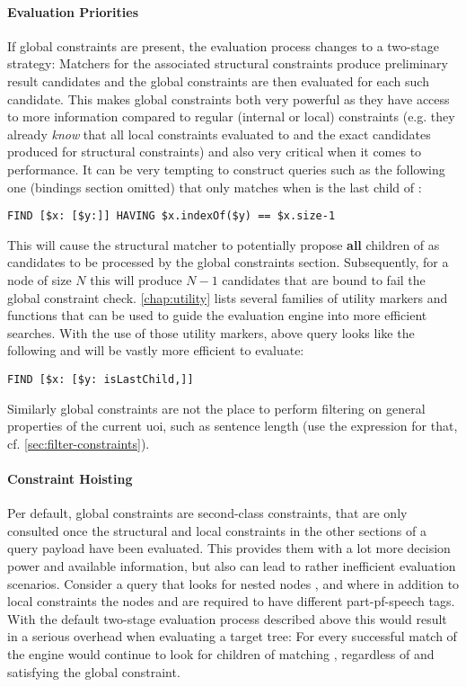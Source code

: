 \documentclass[11pt,a4paper]{report}
\begin{document}
\paragraph{Evaluation Priorities}
\noindent If global constraints are present, the evaluation process changes to a two-stage strategy:
Matchers for the associated structural constraints produce preliminary result candidates and the global constraints are then evaluated for each such candidate.
This makes global constraints both very powerful as they have access to more information compared to regular (internal or local) constraints (e.g. they already \textit{know} that all local constraints evaluated to  and the exact candidates produced for structural constraints) and also very critical when it comes to performance.
It can be very tempting to construct queries such as the following one (bindings section omitted) that only matches when  is the last child of :
\begin{Verbatim}[samepage=true]
FIND [$x: [$y:]] HAVING $x.indexOf($y) == $x.size-1
\end{Verbatim}
This will cause the structural matcher to potentially propose \textbf{all} children of  as candidates to be processed by the global constraints section.
Subsequently, for a node of size $N$ this will produce $N-1$ candidates that are bound to fail the global constraint check.
\cref{chap:utility} lists several families of utility markers and functions that can be used to guide the evaluation engine into more efficient searches.
With the use of those utility markers, above query looks like the following and will be vastly more efficient to evaluate:
\begin{Verbatim}[samepage=true]
FIND [$x: [$y: isLastChild,]]
\end{Verbatim}
Similarly global constraints are not the place to perform filtering on general properties of the current \ac{uoi}, such as sentence length (use the  expression for that, cf. \cref{sec:filter-constraints}).

\paragraph{Constraint Hoisting}
Per default, global constraints are second-class constraints, that are only consulted once the structural and local constraints in the other sections of a query payload have been evaluated.
This provides them with a lot more decision power and available information, but also can lead to rather inefficient evaluation scenarios.
Consider a query  that looks for nested nodes ,  and  where in addition to local constraints the nodes  and  are required to have different part-pf-speech tags.
With the default two-stage evaluation process described above this would result in a serious overhead when evaluating a target tree: 
For every successful match of \query{[\$x:~[\$y:]]} the engine would continue to look for children of  matching , regardless of  and  satisfying the global constraint.
\end{document}
